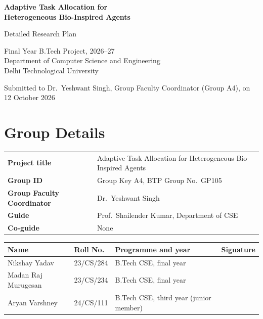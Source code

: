 \documentclass[11pt,a4paper]{article}
\newcommand{\juniorroll}{24/CS/111}
\newcommand{\head}[1]{\textbf{#1}}
\begin{document}
\begin{center}
  {\LARGE\bfseries Adaptive Task Allocation for\\[3pt]
  Heterogeneous Bio-Inspired Agents\par}
  \vspace{12pt}
  {\large Detailed Research Plan\par}
  \vspace{5pt}
  Final Year B.Tech Project, 2026--27\\
  Department of Computer Science and Engineering\\
  Delhi Technological University\par
  \vspace{8pt}
  {\small Submitted to Dr.~Yeshwant Singh, Group Faculty Coordinator (Group A4), on 12 October 2026}
\end{center}
\vspace{2pt}

\section{Group Details}

\begin{tabularx}{\textwidth}{@{}P{5.0cm}L@{}}
\toprule
\head{Project title} & Adaptive Task Allocation for Heterogeneous Bio-Inspired Agents \\
\head{Group ID} & Group Key A4, BTP Group No.\ GP105 \\
\head{Group Faculty Coordinator} & Dr.~Yeshwant Singh \\
\head{Guide} & Prof.~Shailender Kumar, Department of CSE \\
\head{Co-guide} & None \\
\bottomrule
\end{tabularx}

\vspace{6pt}

\begin{tabularx}{\textwidth}{@{}P{3.6cm}P{2.1cm}LP{2.3cm}@{}}
\toprule
\head{Name} & \head{Roll No.} & \head{Programme and year} & \head{Signature} \\
\midrule
Nikshay Yadav & 23/CS/284 & B.Tech CSE, final year & \\[7pt]
Madan Raj Murugesan & 23/CS/234 & B.Tech CSE, final year & \\[7pt]
Aryan Varshney & \juniorroll & B.Tech CSE, third year (junior member) & \\[7pt]
\bottomrule
\end{tabularx}
\end{document}
